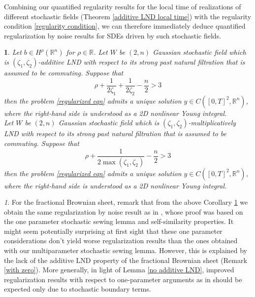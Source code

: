 \documentclass[11pt,oneside,english,reqno]{amsart}
\numberwithin{equation}{section}
\numberwithin{figure}{section}
\theoremstyle{plain}
\theoremstyle{definition}
\theoremstyle{remark}
\newtheorem{rem}[thm]{\protect\remarkname}
\theoremstyle{plain}
\theoremstyle{plain}
\theoremstyle{plain}
\newtheorem{cor}[thm]{\protect\corollaryname}
\theoremstyle{plain}
\theoremstyle{plain}
\providecommand{\corollaryname}{Corollary}
\providecommand{\remarkname}{Remark}
\newcommand{\RR}{\mathbb{R}}
\begin{document}
\noindent
Combining our quantified regularity results for the local time of realizations of different stochastic fields (Theorem \ref{additive LND local time}) with the regularity condition \eqref{regularity condition}, we can therefore immediately deduce quantified regularization by noise results for SDEs driven by such stochastic fields.


\begin{cor}
\label{regularizing cor}
   Let $b\in H^{\rho}(\RR^n)$ for $\rho\in \RR$. Let $W$ be $(2, n)$ Gaussian stochastic field which is $(\zeta_1, \zeta_2)$-additive LND with respect to its strong past natural filtration that is assumed to be commuting. Suppose that 
    \[
   \rho+\frac{1}{2\zeta_1}+\frac{1}{2\zeta_2}-\frac{n}{2}>3
    \]
   then the problem \eqref{regularized eqn} admits a unique solution $y\in C([0, T]^2, \RR^n)$, where the right-hand side is understood as a 2D nonlinear Young integral. \\
  Let $W$ be $(2, n)$ Gaussian stochastic field which is $(\zeta_1, \zeta_2)$-multiplicatively LND with respect to its strong past natural filtration that is assumed to be commuting. Suppose that 
    \[
   \rho+\frac{1}{2\max(\zeta_1, \zeta_2)}-\frac{n}{2}>3
    \]
   then the problem \eqref{regularized eqn} admits a unique solution $y\in C([0, T]^2, \RR^n)$, where the right-hand side is understood as a 2D nonlinear Young integral. 
\end{cor}

\begin{rem}
    For the fractional Brownian sheet, remark that from the above Corollary \ref{regularizing cor} we obtain the same regularization by noise result as in \cite[Theorem 33]{Bechtold2023}, whose proof was based on the one parameter stochastic sewing lemma and self-similarity properties. It might seem potentially surprising at first sight that these one parameter considerations don't yield worse regularization results than the ones obtained with our multiparameter stochastic sewing lemma. However, this is explained by the lack of the additive LND property of the fractional Brownian sheet (Remark \ref{with zero}). More generally, in light of Lemma \ref{no additive LND}, improved regularization results with respect to one-parameter arguments as in \cite[Theorem 31]{Bechtold2023} should be expected only due to stochastic boundary terms.
    
\end{rem}
\end{document}
